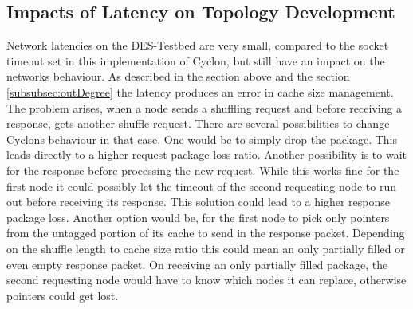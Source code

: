\subsection{Impacts of Latency on Topology Development}
	Network latencies on the DES-Testbed are very small, compared to the socket
	timeout set in this implementation of Cyclon, but still have an impact on the
	networks behaviour. As described in the section above and the section
	\ref{subsubsec:outDegree} the latency produces an error in cache size
	management. The problem arises, when a node sends a shuffling request and
	before receiving a response, gets another shuffle request. There are several
	possibilities to change Cyclons behaviour in that case. One would be to simply drop
	the package. This leads directly to a higher request package loss ratio.
	Another possibility is to wait for the response before processing the new
	request. While this works fine for the first node it could possibly let the
	timeout of the second requesting node to run out before receiving its response. This
	solution could lead to a higher response package loss. Another option would be,
	for the first node to pick only pointers from the untagged portion of its cache
	to send in the response packet. Depending on the shuffle length to cache size
	ratio this could mean an only partially filled or even empty response packet.
	On receiving an only partially filled package, the second requesting node would
	have to know which nodes it can replace, otherwise pointers could get lost.